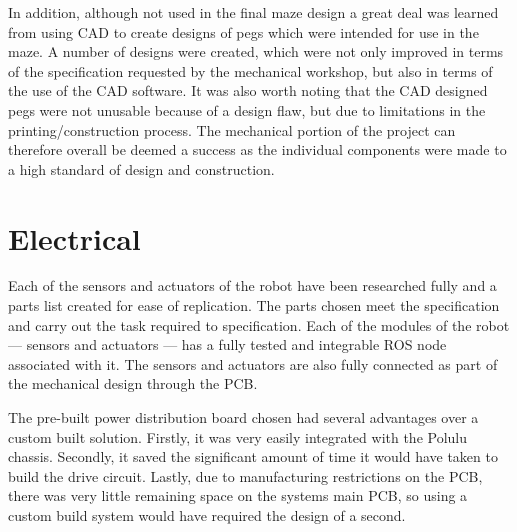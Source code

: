 In addition, although not used in the final maze design a great deal was learned from 
using CAD to create designs of pegs which were intended for use in the maze. A number 
of designs were created, which were not only improved in terms of the specification 
requested by the mechanical workshop, but also in terms of the use of the CAD 
software. It was also worth noting that the CAD designed pegs were not unusable 
because of a design flaw, but due to limitations in the printing/construction process. 
The mechanical portion of the project can therefore overall be deemed a success as 
the individual components were made to a high standard of design and construction. 

\section{Electrical}\label{eval/elec}
Each of the sensors and actuators of the robot have been researched fully and a 
parts list created for ease of replication. The parts chosen meet the 
specification and carry out the task required to specification. 
Each of the modules of the robot --- sensors and actuators --- has a fully 
tested and integrable ROS node associated with it. The sensors and actuators are 
also fully connected as part of the mechanical design through the PCB. 

The pre-built power distribution board chosen had several advantages over a custom built solution. Firstly, it was very easily integrated with the Polulu chassis. Secondly, it saved the significant amount of time it would have taken to build the drive circuit. Lastly, due to manufacturing restrictions on the PCB, there was very little remaining space on the systems main PCB, so using a custom build system would have required the design of a second. 

